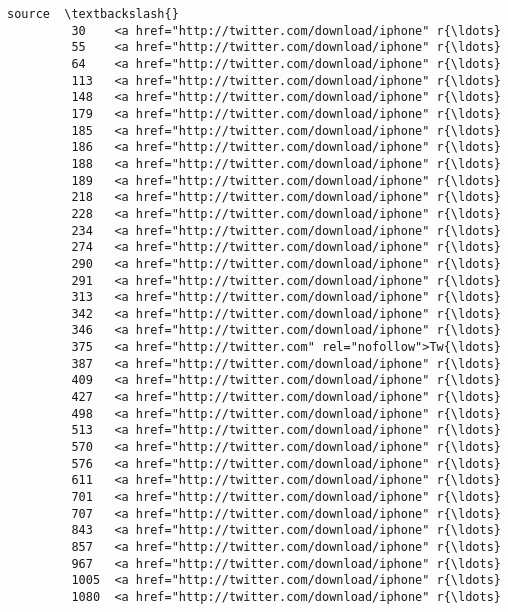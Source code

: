 \documentclass[11pt]{article}
\begin{document}
\begin{Verbatim}[commandchars=\\\{\}]
                                                          source  \textbackslash{}
         30    <a href="http://twitter.com/download/iphone" r{\ldots}   
         55    <a href="http://twitter.com/download/iphone" r{\ldots}   
         64    <a href="http://twitter.com/download/iphone" r{\ldots}   
         113   <a href="http://twitter.com/download/iphone" r{\ldots}   
         148   <a href="http://twitter.com/download/iphone" r{\ldots}   
         179   <a href="http://twitter.com/download/iphone" r{\ldots}   
         185   <a href="http://twitter.com/download/iphone" r{\ldots}   
         186   <a href="http://twitter.com/download/iphone" r{\ldots}   
         188   <a href="http://twitter.com/download/iphone" r{\ldots}   
         189   <a href="http://twitter.com/download/iphone" r{\ldots}   
         218   <a href="http://twitter.com/download/iphone" r{\ldots}   
         228   <a href="http://twitter.com/download/iphone" r{\ldots}   
         234   <a href="http://twitter.com/download/iphone" r{\ldots}   
         274   <a href="http://twitter.com/download/iphone" r{\ldots}   
         290   <a href="http://twitter.com/download/iphone" r{\ldots}   
         291   <a href="http://twitter.com/download/iphone" r{\ldots}   
         313   <a href="http://twitter.com/download/iphone" r{\ldots}   
         342   <a href="http://twitter.com/download/iphone" r{\ldots}   
         346   <a href="http://twitter.com/download/iphone" r{\ldots}   
         375   <a href="http://twitter.com" rel="nofollow">Tw{\ldots}   
         387   <a href="http://twitter.com/download/iphone" r{\ldots}   
         409   <a href="http://twitter.com/download/iphone" r{\ldots}   
         427   <a href="http://twitter.com/download/iphone" r{\ldots}   
         498   <a href="http://twitter.com/download/iphone" r{\ldots}   
         513   <a href="http://twitter.com/download/iphone" r{\ldots}   
         570   <a href="http://twitter.com/download/iphone" r{\ldots}   
         576   <a href="http://twitter.com/download/iphone" r{\ldots}   
         611   <a href="http://twitter.com/download/iphone" r{\ldots}   
         701   <a href="http://twitter.com/download/iphone" r{\ldots}   
         707   <a href="http://twitter.com/download/iphone" r{\ldots}   
         843   <a href="http://twitter.com/download/iphone" r{\ldots}   
         857   <a href="http://twitter.com/download/iphone" r{\ldots}   
         967   <a href="http://twitter.com/download/iphone" r{\ldots}   
         1005  <a href="http://twitter.com/download/iphone" r{\ldots}   
         1080  <a href="http://twitter.com/download/iphone" r{\ldots}   

\end{Verbatim}
\end{document}
